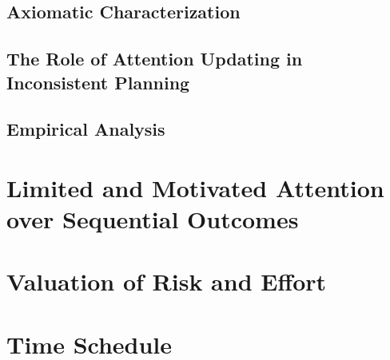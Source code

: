 \documentclass[
  12pt,
]{article}
\begin{document}
\hypertarget{axiomatic-characterization}{%
\subsection{\texorpdfstring{Axiomatic Characterization
\label{axiom}}{Axiomatic Characterization }}\label{axiomatic-characterization}}

\hypertarget{the-role-of-attention-updating-in-inconsistent-planning}{%
\subsection{The Role of Attention Updating in Inconsistent
Planning}\label{the-role-of-attention-updating-in-inconsistent-planning}}

\hypertarget{empirical-analysis}{%
\subsection{Empirical Analysis}\label{empirical-analysis}}

\hypertarget{limited-and-motivated-attention-over-sequential-outcomes}{%
\section{Limited and Motivated Attention over Sequential
Outcomes}\label{limited-and-motivated-attention-over-sequential-outcomes}}

\hypertarget{valuation-of-risk-and-effort}{%
\section{Valuation of Risk and
Effort}\label{valuation-of-risk-and-effort}}

\hypertarget{time-schedule}{%
\section{Time Schedule}\label{time-schedule}}

\renewcommand\refname{Reply to Comments}
  
\end{document}
